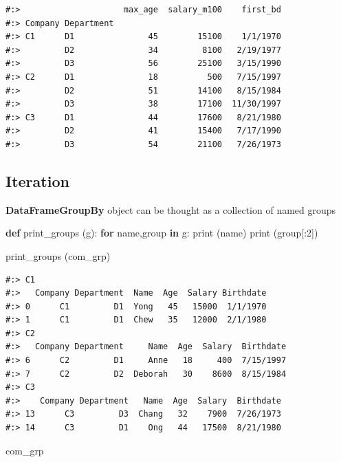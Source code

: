 \documentclass[
]{book}
\newenvironment{Shaded}{\begin{snugshade}}{\end{snugshade}}
\newcommand{\BuiltInTok}[1]{#1}
\newcommand{\ControlFlowTok}[1]{\textcolor[rgb]{0.27,0.27,0.27}{\textbf{#1}}}
\newcommand{\DecValTok}[1]{\textcolor[rgb]{0.06,0.06,0.06}{#1}}
\newcommand{\KeywordTok}[1]{\textcolor[rgb]{0.27,0.27,0.27}{\textbf{#1}}}
\newcommand{\NormalTok}[1]{#1}
\begin{document}
\begin{verbatim}
#:>                     max_age  salary_m100    first_bd
#:> Company Department                                  
#:> C1      D1               45        15100    1/1/1970
#:>         D2               34         8100   2/19/1977
#:>         D3               56        25100   3/15/1990
#:> C2      D1               18          500   7/15/1997
#:>         D2               51        14100   8/15/1984
#:>         D3               38        17100  11/30/1997
#:> C3      D1               44        17600   8/21/1980
#:>         D2               41        15400   7/17/1990
#:>         D3               54        21100   7/26/1973
\end{verbatim}

\hypertarget{iteration-1}{%
\subsection{Iteration}\label{iteration-1}}

\textbf{DataFrameGroupBy} object can be thought as a collection of named groups

\begin{Shaded}
\begin{Highlighting}[]
\KeywordTok{def}\NormalTok{ print_groups (g):}
    \ControlFlowTok{for}\NormalTok{ name,group }\KeywordTok{in}\NormalTok{ g:}
        \BuiltInTok{print}\NormalTok{ (name)}
        \BuiltInTok{print}\NormalTok{ (group[:}\DecValTok{2}\NormalTok{])}
        
\NormalTok{print_groups (com_grp)}
\end{Highlighting}
\end{Shaded}

\begin{verbatim}
#:> C1
#:>   Company Department  Name  Age  Salary Birthdate
#:> 0      C1         D1  Yong   45   15000  1/1/1970
#:> 1      C1         D1  Chew   35   12000  2/1/1980
#:> C2
#:>   Company Department     Name  Age  Salary  Birthdate
#:> 6      C2         D1     Anne   18     400  7/15/1997
#:> 7      C2         D2  Deborah   30    8600  8/15/1984
#:> C3
#:>    Company Department   Name  Age  Salary  Birthdate
#:> 13      C3         D3  Chang   32    7900  7/26/1973
#:> 14      C3         D1    Ong   44   17500  8/21/1980
\end{verbatim}

\begin{Shaded}
\begin{Highlighting}[]
\NormalTok{com_grp}
\end{Highlighting}
\end{Shaded}
\end{document}
